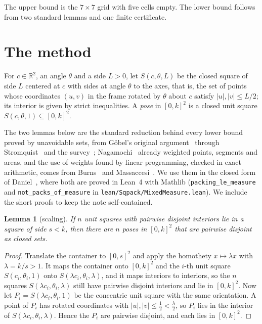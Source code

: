\documentclass[11pt]{amsart}
\newtheorem{lemma}[theorem]{Lemma}
\theoremstyle{remark}
\begin{document}
The upper bound is the $7\times7$ grid with five cells empty. The lower bound follows from two standard lemmas and
one finite certificate.

\section{The method}

For $c\in\mathbb R^2$, an angle $\theta$ and a side $L>0$, let $S(c,\theta,L)$ be the closed square of side $L$
centered at $c$ with sides at angle $\theta$ to the axes, that is, the set of points whose coordinates
$(u,v)$ in the frame rotated by $\theta$ about $c$ satisfy $|u|,|v|\le L/2$; its interior is given by strict
inequalities. A \emph{pose} in $[0,k]^2$ is a closed unit square $S(c,\theta,1)\subseteq[0,k]^2$.

The two lemmas below are the standard reduction behind every lower bound proved by unavoidable sets, from
Göbel's original argument~\cite{goebel} through Stromquist~\cite{stromquist} and the survey~\cite{friedman};
Nagamochi~\cite{nagamochi} already weighted points, segments and areas, and the use of weights found by linear
programming, checked in exact arithmetic, comes from Burns~\cite{burns} and Massaccesi~\cite{massaccesi}. We use
them in the closed form of Daniel~\cite{daniel}, where both are proved in Lean~4 with Mathlib
(\texttt{packing\_le\_measure} and \texttt{not\_packs\_of\_measure} in \texttt{lean/Sqpack/MixedMeasure.lean}).
We include the short proofs to keep the note self-contained.

\begin{lemma}[scaling]\label{lem:scale}
If $n$ unit squares with pairwise disjoint interiors lie in a square of side $s<k$, then there are $n$ poses in
$[0,k]^2$ that are pairwise disjoint as closed sets.
\end{lemma}

\begin{proof}
Translate the container to $[0,s]^2$ and apply the homothety $x\mapsto\lambda x$ with $\lambda=k/s>1$. It maps the
container onto $[0,k]^2$ and the $i$-th unit square $S(c_i,\theta_i,1)$ onto $S(\lambda c_i,\theta_i,\lambda)$,
and it maps interiors to interiors, so the $n$ squares $S(\lambda c_i,\theta_i,\lambda)$ still have pairwise
disjoint interiors and lie in $[0,k]^2$. Now let $P_i=S(\lambda c_i,\theta_i,1)$ be the concentric unit square with
the same orientation. A point of $P_i$ has rotated coordinates with $|u|,|v|\le\frac12<\frac\lambda2$, so $P_i$ lies
in the interior of $S(\lambda c_i,\theta_i,\lambda)$. Hence the $P_i$ are pairwise disjoint, and each lies in
$[0,k]^2$.
\end{proof}
\end{document}
